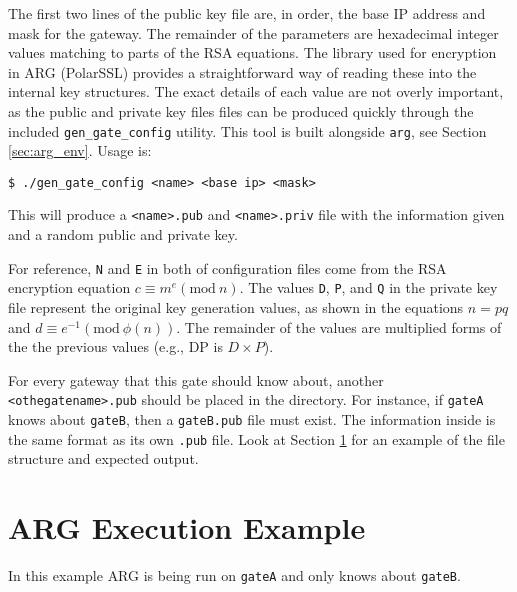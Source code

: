 


\par The first two lines of the public key file are, in order, the base \ac{IP} address and mask for the gateway. The remainder of the parameters are hexadecimal integer values matching to parts of the \ac{RSA} equations. The library used for encryption in \ac{ARG} (PolarSSL) provides a straightforward way of reading these into the internal key structures. The exact details of each value are not overly important, as the public and private key files files can be produced quickly through the included \texttt{gen\_gate\_config} utility. This tool is built alongside \texttt{arg}, see Section \ref{sec:arg_env}. Usage is:

\begin{lstlisting}
$ ./gen_gate_config <name> <base ip> <mask>
\end{lstlisting}

\par This will produce a \texttt{<name>.pub} and \texttt{<name>.priv} file with the information given and a random public and private key.

\par For reference, \texttt{N} and \texttt{E} in both of configuration files come from the \ac{RSA} encryption equation $c \equiv m^e (\text{mod}~n)$. The values \texttt{D}, \texttt{P}, and \texttt{Q} in the private key file represent the original key generation values, as shown in the equations $n = pq$ and $d \equiv e^{-1} (\text{mod}~\phi(n))$. The remainder of the values are multiplied forms of the the previous values (e.g., DP is $D \times P$).

\par For every gateway that this gate should know about, another \texttt{<othegatename>.pub} should be placed in the directory. For instance, if \texttt{gateA} knows about \texttt{gateB}, then a \texttt{gateB.pub} file must exist. The information inside is the same format as its own \texttt{.pub} file. Look at Section \ref{sec:arg_run_example} for an example of the file structure and expected output.

\section{\ac{ARG} Execution Example}
\label{sec:arg_run_example}
\par In this example \ac{ARG} is being run on \texttt{gateA} and only knows about \texttt{gateB}.

